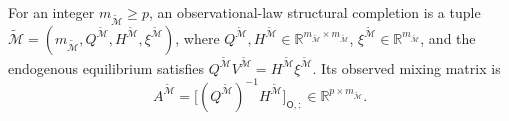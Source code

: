 For an integer \(m_{\widetilde{\mathcal M}}\ge p\), an observational-law structural completion is a tuple \(\widetilde{\mathcal M}=(m_{\widetilde{\mathcal M}},Q^{\widetilde{\mathcal M}},H^{\widetilde{\mathcal M}},\xi^{\widetilde{\mathcal M}})\), where \(Q^{\widetilde{\mathcal M}},H^{\widetilde{\mathcal M}}\in\mathbb R^{m_{\widetilde{\mathcal M}}\times m_{\widetilde{\mathcal M}}}\), \(\xi^{\widetilde{\mathcal M}}\in\mathbb R^{m_{\widetilde{\mathcal M}}}\), and the endogenous equilibrium satisfies \(Q^{\widetilde{\mathcal M}}V^{\widetilde{\mathcal M}}=H^{\widetilde{\mathcal M}}\xi^{\widetilde{\mathcal M}}\). Its observed mixing matrix is
\[
 A^{\widetilde{\mathcal M}}
 =\bigl[(Q^{\widetilde{\mathcal M}})^{-1}H^{\widetilde{\mathcal M}}\bigr]_{\mathsf O,:}
 \in\mathbb R^{p\times m_{\widetilde{\mathcal M}}}.
\]